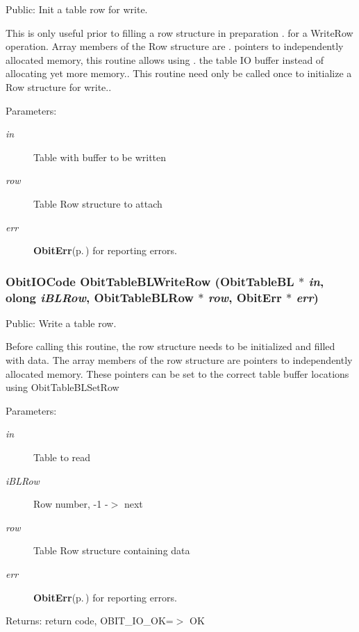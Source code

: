Public: Init a table row for write. 

This is only useful prior to filling a row structure in preparation . for a Write\-Row operation. Array members of the Row structure are . pointers to independently allocated memory, this routine allows using . the table IO buffer instead of allocating yet more memory.. This routine need only be called once to initialize a Row structure for write.. \begin{Desc}
\item[Parameters:]
\begin{description}
\item[{\em in}]Table with buffer to be written \item[{\em row}]Table Row structure to attach \item[{\em err}]{\bf Obit\-Err}{\rm (p.\,\pageref{structObitErr})} for reporting errors. \end{description}
\end{Desc}
\subsubsection{\setlength{\rightskip}{0pt plus 5cm}Obit\-IOCode Obit\-Table\-BLWrite\-Row ({\bf Obit\-Table\-BL} $\ast$ {\em in}, {\bf olong} {\em i\-BLRow}, {\bf Obit\-Table\-BLRow} $\ast$ {\em row}, {\bf Obit\-Err} $\ast$ {\em err})}\label{ObitTableBL_8h_a20}


Public: Write a table row. 

Before calling this routine, the row structure needs to be initialized and filled with data. The array members of the row structure are pointers to independently allocated memory. These pointers can be set to the correct table buffer locations using Obit\-Table\-BLSet\-Row \begin{Desc}
\item[Parameters:]
\begin{description}
\item[{\em in}]Table to read \item[{\em i\-BLRow}]Row number, -1 -$>$ next \item[{\em row}]Table Row structure containing data \item[{\em err}]{\bf Obit\-Err}{\rm (p.\,\pageref{structObitErr})} for reporting errors. \end{description}
\end{Desc}
\begin{Desc}
\item[Returns:]return code, OBIT\_\-IO\_\-OK=$>$ OK \end{Desc}
